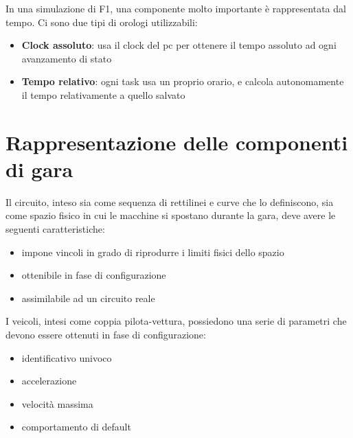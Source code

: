 In una simulazione di F1, una componente molto importante è rappresentata dal tempo. Ci sono due tipi di orologi utilizzabili:
\begin{itemize}
 \item \textbf{Clock assoluto}: usa il clock del pc per ottenere il tempo assoluto ad ogni avanzamento di stato
 \item \textbf{Tempo relativo}: ogni task usa un proprio orario, e calcola autonomamente il tempo relativamente a quello salvato
\end{itemize}


\section{Rappresentazione delle componenti di gara}
Il circuito, inteso sia come sequenza di rettilinei e curve che lo definiscono, sia come spazio fisico in cui le macchine si spostano durante la gara, deve avere le seguenti caratteristiche:
\begin{itemize}
\item impone vincoli in grado di riprodurre i limiti fisici dello spazio
\item ottenibile in fase di configurazione
\item assimilabile ad un circuito reale
\end{itemize}

I veicoli, intesi come coppia pilota-vettura, possiedono una serie di parametri che devono essere ottenuti in fase di configurazione:
\begin{itemize}
\item identificativo univoco
\item accelerazione
\item velocità massima
\item comportamento di default
\end{itemize}


